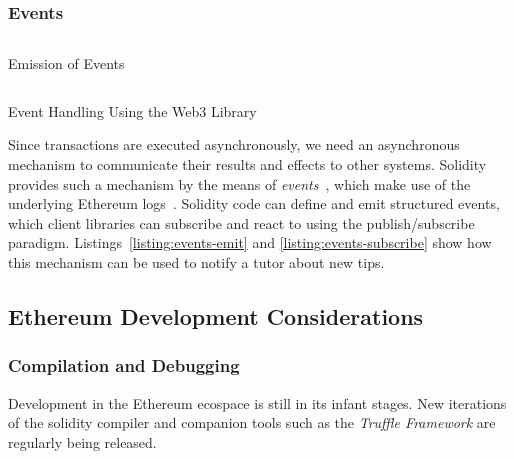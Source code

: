 \subsubsection{Events}
\label{sec:dev:events}

\begin{listing}[]
\inputminted[breaklines,fontsize=\footnotesize]{solidity}{Event.sol}
\caption{Emission of Events}
\label{listing:events-emit}
\end{listing}

\begin{listing}[]
\inputminted[breaklines,fontsize=\footnotesize]{javascript}{Event_ui.js}
\caption{Event Handling Using the Web3 Library}
\label{listing:events-subscribe}
\end{listing}

Since transactions are executed asynchronously, we need an asynchronous mechanism
to communicate their results and effects to other systems.
Solidity provides such a mechanism by the means of \emph{events}~\cite{ConsenSys16}, which make use of the underlying Ethereum
logs~\cite[sec. 4]{Wood18}. Solidity code can define and emit structured events,
which client libraries can subscribe and react to using the publish/subscribe paradigm. %
Listings~\ref{listing:events-emit} and \ref{listing:events-subscribe} show how this mechanism
can be used to notify a tutor about new tips.



\subsection{Ethereum Development Considerations}

\subsubsection{Compilation and Debugging}Development in the Ethereum ecospace is still in its infant stages. New iterations of the
solidity compiler and companion tools such as the \emph{Truffle Framework} are regularly being
released.

